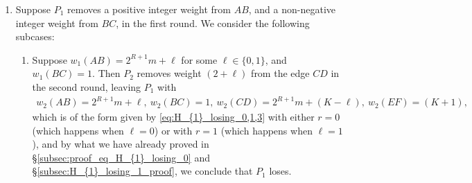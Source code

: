 \documentclass[11pt,reqno]{amsart}
\theoremstyle{definition}
\theoremstyle{definition}
\begin{document}
\begin{enumerate}
\begin{enumerate}
\item Suppose $w_{1}(CD)=2^{R+1}m+\ell$ for some $\ell \leqslant K$, and $w_{1}(BC)=0$. This leaves $P_{2}$ with a galaxy graph consisting of the edges $AB$, $CD$ and $EF$, where $w_{1}(AB)=2^{R+1}m+2$, $w_{1}(CD)=2^{R+1}m+\ell$ and $w_{1}(EF)=(K+1)$. If $\ell \leqslant K-2$, $P_{2}$ wins by Lemma~\ref{lem:H_{1}_winning_galaxy}. 

Suppose, now, that $\ell=K$. Since $K \equiv 0 \bmod 4$, the triple $(2^{R+1}m+1,2^{R+1}m+K,K+1)$ is balanced, which means that the triple $(2^{R+1}m+2,2^{R+1}m+K,K+1)$ is unbalanced, so that $P_{2}$ wins by Theorem~\ref{thm:galaxy}. Likewise, if $\ell=(K-1)$, since $K \equiv 0 \bmod 4$, the triple $(2^{R+1}m+2,2^{R+1}m+K-1,K-3)$ is balanced, which means that the triple $(2^{R+1}m+2,2^{R+1}m+K-1,K+1)$ is unbalanced, and $P_{2}$ wins by Theorem~\ref{thm:galaxy}. 

\item If $w_{1}(CD)=2^{R+1}m+(K+1)$, then the configuration after the first round is of the form stated in Lemma~\ref{prop:H_{1}_winning_1}, with $m_{1}=m_{2}=m$, $\ell_{1}=2$, $\ell_{2}=(K+1)$ and $k=(K+1)$. Since $k=\ell_{1}$ (so that $k \in \{\ell_{1},\ell_{2}\}$) and $\min\{\ell_{1},\ell_{2}\}\neq 0$, hence $P_{2}$ wins by Lemma~\ref{prop:H_{1}_winning_1}.

\item If $w_{1}(CD)=2^{R+1}n+\ell_{1}$ for some $n < m$ and $\ell\in\{0,1,\ldots,2^{R+1}-1\}$, the configuration is of the same form as in Lemma~\ref{prop:H_{1}_winning_1}, with $m_{1}=n$, $m_{2}=m$ and $\ell_{2}=2$, and as $n < m \implies m_{1}\neq m_{2}$, we know that $P_{2}$ wins by Lemma~\ref{prop:H_{1}_winning_1}.
\end{enumerate}

\item Suppose $P_{1}$ removes a positive integer weight from $AB$, and a non-negative integer weight from $BC$, in the first round. We consider the following subcases:
\begin{enumerate}
\item Suppose $w_{1}(AB)=2^{R+1}m+\ell$ for some $\ell \in \{0,1\}$, and $w_{1}(BC)=1$. Then $P_{2}$ removes weight $(2+\ell)$ from the edge $CD$ in the second round, leaving $P_{1}$ with
\begin{align}
w_{2}(AB)=2^{R+1}m+\ell,\ w_{2}(BC)=1,\ w_{2}(CD)=2^{R+1}m+(K-\ell),\ w_{2}(EF)=(K+1),\nonumber
\end{align}
which is of the form given by \eqref{eq:H_{1}_losing_0,1,3} with either $r=0$ (which happens when $\ell=0$) or with $r=1$ (which happens when $\ell=1$), and by what we have already proved in \S\ref{subsec:proof_eq_H_{1}_losing_0} and \S\ref{subsec:H_{1}_losing_1_proof}, we conclude that $P_{1}$ loses.


\end{enumerate}
\end{enumerate}
\end{document}
